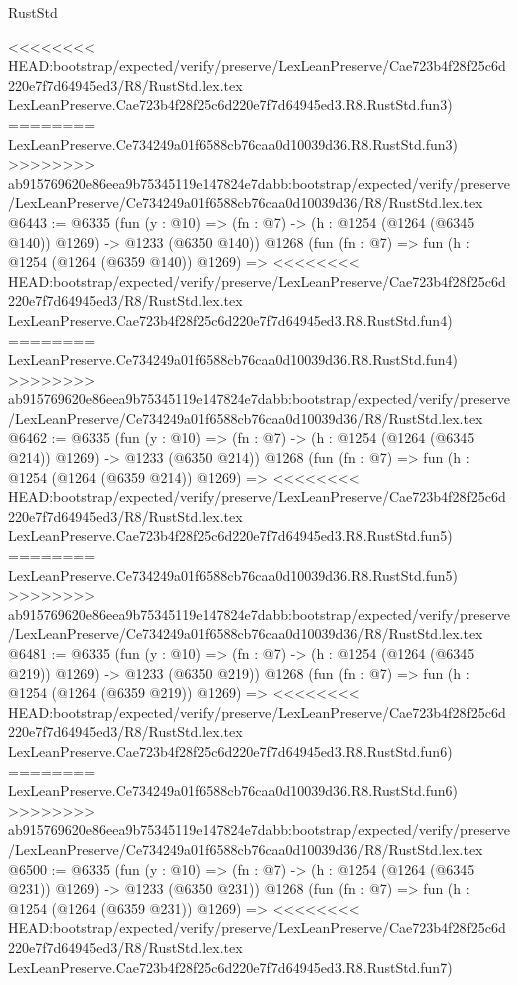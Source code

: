 \begin{lexlean}{RustStd}
\begin{coremodule}
{\begin{coremodule}
{{{{{{{{{{{{{<<<<<<<< HEAD:bootstrap/expected/verify/preserve/LexLeanPreserve/Cae723b4f28f25c6d220e7f7d64945ed3/R8/RustStd.lex.tex
    LexLeanPreserve.Cae723b4f28f25c6d220e7f7d64945ed3.R8.RustStd.fun3)
========
    LexLeanPreserve.Ce734249a01f6588cb76caa0d10039d36.R8.RustStd.fun3)
>>>>>>>> ab915769620e86eea9b75345119e147824e7dabb:bootstrap/expected/verify/preserve/LexLeanPreserve/Ce734249a01f6588cb76caa0d10039d36/R8/RustStd.lex.tex
@6443 := @6335
    (fun (y : @10) => (fn : @7) -> (h : @1254 (@1264 (@6345 @140)) @1269) -> @1233 (@6350 @140))
    @1268
    (fun (fn : @7) =>
    fun (h : @1254 (@1264 (@6359 @140)) @1269) =>
<<<<<<<< HEAD:bootstrap/expected/verify/preserve/LexLeanPreserve/Cae723b4f28f25c6d220e7f7d64945ed3/R8/RustStd.lex.tex
    LexLeanPreserve.Cae723b4f28f25c6d220e7f7d64945ed3.R8.RustStd.fun4)
========
    LexLeanPreserve.Ce734249a01f6588cb76caa0d10039d36.R8.RustStd.fun4)
>>>>>>>> ab915769620e86eea9b75345119e147824e7dabb:bootstrap/expected/verify/preserve/LexLeanPreserve/Ce734249a01f6588cb76caa0d10039d36/R8/RustStd.lex.tex
@6462 := @6335
    (fun (y : @10) => (fn : @7) -> (h : @1254 (@1264 (@6345 @214)) @1269) -> @1233 (@6350 @214))
    @1268
    (fun (fn : @7) =>
    fun (h : @1254 (@1264 (@6359 @214)) @1269) =>
<<<<<<<< HEAD:bootstrap/expected/verify/preserve/LexLeanPreserve/Cae723b4f28f25c6d220e7f7d64945ed3/R8/RustStd.lex.tex
    LexLeanPreserve.Cae723b4f28f25c6d220e7f7d64945ed3.R8.RustStd.fun5)
========
    LexLeanPreserve.Ce734249a01f6588cb76caa0d10039d36.R8.RustStd.fun5)
>>>>>>>> ab915769620e86eea9b75345119e147824e7dabb:bootstrap/expected/verify/preserve/LexLeanPreserve/Ce734249a01f6588cb76caa0d10039d36/R8/RustStd.lex.tex
@6481 := @6335
    (fun (y : @10) => (fn : @7) -> (h : @1254 (@1264 (@6345 @219)) @1269) -> @1233 (@6350 @219))
    @1268
    (fun (fn : @7) =>
    fun (h : @1254 (@1264 (@6359 @219)) @1269) =>
<<<<<<<< HEAD:bootstrap/expected/verify/preserve/LexLeanPreserve/Cae723b4f28f25c6d220e7f7d64945ed3/R8/RustStd.lex.tex
    LexLeanPreserve.Cae723b4f28f25c6d220e7f7d64945ed3.R8.RustStd.fun6)
========
    LexLeanPreserve.Ce734249a01f6588cb76caa0d10039d36.R8.RustStd.fun6)
>>>>>>>> ab915769620e86eea9b75345119e147824e7dabb:bootstrap/expected/verify/preserve/LexLeanPreserve/Ce734249a01f6588cb76caa0d10039d36/R8/RustStd.lex.tex
@6500 := @6335
    (fun (y : @10) => (fn : @7) -> (h : @1254 (@1264 (@6345 @231)) @1269) -> @1233 (@6350 @231))
    @1268
    (fun (fn : @7) =>
    fun (h : @1254 (@1264 (@6359 @231)) @1269) =>
<<<<<<<< HEAD:bootstrap/expected/verify/preserve/LexLeanPreserve/Cae723b4f28f25c6d220e7f7d64945ed3/R8/RustStd.lex.tex
    LexLeanPreserve.Cae723b4f28f25c6d220e7f7d64945ed3.R8.RustStd.fun7)
}}}}}}}}}}}}}
\end{coremodule}}
\end{coremodule}
\end{lexlean}

